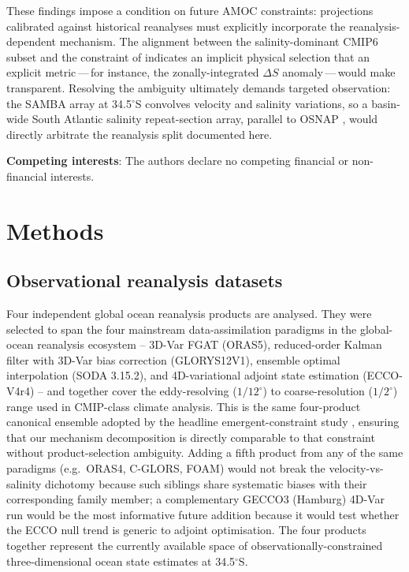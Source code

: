 \documentclass[11pt,a4paper]{article}
\begin{document}
These findings impose a condition on future AMOC constraints: projections calibrated against historical reanalyses must explicitly incorporate the reanalysis-dependent mechanism. The alignment between the salinity-dominant CMIP6 subset and the constraint of \citet{Portmann2026} indicates an implicit physical selection that an explicit metric\,---\,for instance, the zonally-integrated $\Delta S$ anomaly\,---\,would make transparent. Resolving the ambiguity ultimately demands targeted observation: the SAMBA array at 34.5$^\circ$S \citep{Meinen2018, Kersale2020, Volkov2024} convolves velocity and salinity variations, so a basin-wide South Atlantic salinity repeat-section array, parallel to OSNAP \citep{Lozier2019, FrajkaWilliams2019}, would directly arbitrate the reanalysis split documented here.

\noindent\textbf{Competing interests}: The authors declare no competing financial or non-financial interests.

\section*{Methods}
\linenumbers

\subsection*{Observational reanalysis datasets}

Four independent global ocean reanalysis products are analysed. They were selected to span the four mainstream data-assimilation paradigms in the global-ocean reanalysis ecosystem -- 3D-Var FGAT (ORAS5), reduced-order Kalman filter with 3D-Var bias correction (GLORYS12V1), ensemble optimal interpolation (SODA 3.15.2), and 4D-variational adjoint state estimation (ECCO-V4r4) -- and together cover the eddy-resolving ($1/12^\circ$) to coarse-resolution ($1/2^\circ$) range used in CMIP-class climate analysis. This is the same four-product canonical ensemble adopted by the headline emergent-constraint study \citep{Portmann2026}, ensuring that our mechanism decomposition is directly comparable to that constraint without product-selection ambiguity. Adding a fifth product from any of the same paradigms (e.g.~ORAS4, C-GLORS, FOAM) would not break the velocity-vs-salinity dichotomy because such siblings share systematic biases with their corresponding family member; a complementary GECCO3 (Hamburg) 4D-Var run would be the most informative future addition because it would test whether the ECCO null trend is generic to adjoint optimisation. The four products together represent the currently available space of observationally-constrained three-dimensional ocean state estimates at 34.5$^\circ$S.
\end{document}
